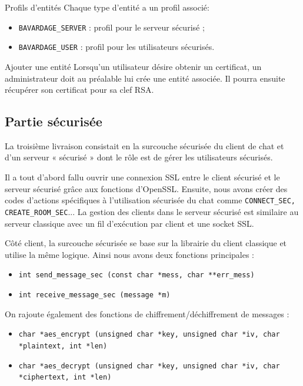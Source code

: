 \documentclass[a4paper,11pt,french]{book}
\begin{document}
\begin{paragraph}{Profils d'entités}
Chaque type d'entité a un profil associé:
\begin{itemize}
\item \verb+BAVARDAGE_SERVER+ : profil pour le serveur sécurisé ;
\item \verb+BAVARDAGE_USER+ : profil pour les utilisateurs sécurisés.
\end{itemize}
\end{paragraph}


\begin{paragraph}{Ajouter une entité}
Lorsqu'un utilisateur désire obtenir un certificat, un administrateur doit au préalable lui crée une entité associée. Il pourra ensuite récupérer son certificat pour sa clef RSA.
\end{paragraph}


\subsection{Partie sécurisée}
La troisième livraison consistait en la surcouche sécurisée du client de chat et d'un serveur « sécurisé » dont le rôle est de gérer les utilisateurs sécurisés.

Il a tout d'abord fallu ouvrir une connexion SSL entre le client sécurisé et le serveur sécurisé grâce aux fonctions d'OpenSSL. Ensuite, nous avons créer des codes d'actions spécifiques à l'utilisation sécurisée du chat comme \verb+CONNECT_SEC, CREATE_ROOM_SEC+... La gestion des clients dans le serveur sécurisé est similaire au serveur classique avec un fil d'exécution par client et une socket SSL.

Côté client, la surcouche sécurisée se base sur la librairie du client classique et utilise la même logique. Ainsi nous avons deux fonctions principales : 
\begin{itemize}
\item \verb+int send_message_sec (const char *mess, char **err_mess)+
\item \verb+int receive_message_sec (message *m)+
\end{itemize}

On rajoute également des fonctions de chiffrement/déchiffrement de messages :
\small{
\begin{itemize}
\item \verb+char *aes_encrypt (unsigned char *key, unsigned char *iv, char *plaintext, int *len)+
\item \verb+char *aes_decrypt (unsigned char *key, unsigned char *iv, char *ciphertext, int *len)+
\end{itemize}
}
\end{document}
